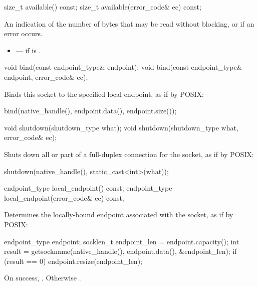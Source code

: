 \begin{itemdecl}
size_t available() const;
size_t available(error_code& ec) const;
\end{itemdecl}

\begin{itemdescr}
\pnum
\returns An indication of the number of bytes that may be read without blocking, or  if an error occurs.

\pnum
\errors
\begin{itemize}
\item
{} --- if  is .
\end{itemize}
\end{itemdescr}

\begin{itemdecl}
void bind(const endpoint_type& endpoint);
void bind(const endpoint_type& endpoint, error_code& ec);
\end{itemdecl}

\begin{itemdescr}
\pnum
\effects Binds this socket to the specified local endpoint, as if by POSIX:
\begin{codeblock}
bind(native_handle(), endpoint.data(), endpoint.size());
\end{codeblock}
\end{itemdescr}

\begin{itemdecl}
void shutdown(shutdown_type what);
void shutdown(shutdown_type what, error_code& ec);
\end{itemdecl}

\begin{itemdescr}
\pnum
\effects Shuts down all or part of a full-duplex connection for the socket, as if by POSIX:
\begin{codeblock}
shutdown(native_handle(), static_cast<int>(what));
\end{codeblock}
\end{itemdescr}

\begin{itemdecl}
endpoint_type local_endpoint() const;
endpoint_type local_endpoint(error_code& ec) const;
\end{itemdecl}

\begin{itemdescr}
\pnum
\effects Determines the locally-bound endpoint associated with the socket, as if by POSIX:
\begin{codeblock}
endpoint_type endpoint;
socklen_t endpoint_len = endpoint.capacity();
int result = getsockname(native_handle(), endpoint.data(), &endpoint_len);
if (result == 0)
  endpoint.resize(endpoint_len);
\end{codeblock}


\pnum
\returns On success, . Otherwise .
\end{itemdescr}

